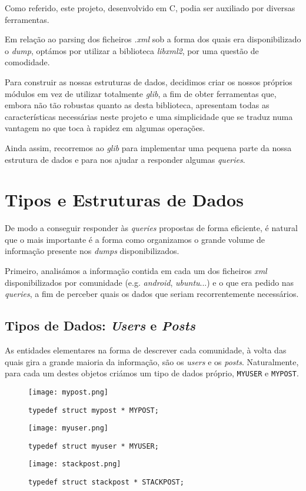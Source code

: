 \documentclass[10pt]{article}
\begin{document}
		Como referido, este projeto, desenvolvido em C, podia ser auxiliado por 
	diversas ferramentas. 
	
		Em relação ao parsing dos ficheiros \emph{.xml} sob
	a forma dos quais era disponibilizado o \textit{dump}, optámos por utilizar a biblioteca
	\textit{libxml2}, por uma questão de comodidade.
	
		Para construir as nossas estruturas de dados, decidimos criar os nossos 
	próprios módulos em vez de utilizar totalmente \textit{glib}, a fim de obter ferramentas
	que, embora não tão robustas quanto as desta biblioteca, apresentam todas as
	características necessárias neste projeto e uma simplicidade que se traduz numa
	vantagem no que toca à rapidez em algumas operações.
	
		Ainda assim, recorremos ao \textit{glib} para implementar uma pequena parte
	da nossa estrutura de dados e para nos ajudar a responder algumas \textit{queries}.
	
	
\section{Tipos e Estruturas de Dados}		

		De modo a conseguir responder às \textit{queries} propostas de forma eficiente, é natural
	que o mais importante é a forma como organizamos o grande volume de informação 
	presente nos \textit{dumps} disponibilizados.
		
		Primeiro, analisámos a informação contida em cada um dos ficheiros \textit{xml}
	disponibilizados por comunidade (e.g. \textit{android}, \textit{ubuntu}...) e o 
	que era pedido nas \textit{queries}, a fim de perceber quais os dados que seriam recorrentemente
	necessários.
	
\subsection{Tipos de Dados: \textit{Users} e \textit{Posts}}
	
		As entidades elementares na forma de descrever cada comunidade, à volta das quais
	gira a grande maioria da informação, são os \textit{users} e os \textit{posts}.
		Naturalmente, para cada um destes objetos criámos um tipo de dados próprio, 
	\texttt{MYUSER} e \texttt{MYPOST}.
	
\begin{figure}[h]
	\begin{minipage}{.5\textwidth}
		\texttt{[image: mypost.png]}\centering
		\caption{\texttt{typedef struct mypost * MYPOST;}}
		\label{fig4:mypost}
	\end{minipage}
	\begin{minipage}{.5\textwidth}
		\texttt{[image: myuser.png]}\centering
		\caption{\texttt{typedef struct myuser * MYUSER;}}
		\label{fig5:myuser}
		
		\texttt{[image: stackpost.png]}\centering
		\caption{\texttt{typedef struct stackpost * STACKPOST;}}
		\label{fig6:stackpost}
	\end{minipage}
\end{figure}	
\end{document}
